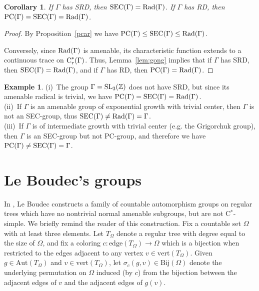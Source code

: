 \documentclass[12pt]{amsart}
\newtheorem{cor}[theorem]{Corollary}
\theoremstyle{definition}
\newtheorem{ex}[theorem]{Example}
\theoremstyle{remark}
\newcommand{\bZ}{{\mathbb{Z}}}
\newcommand{\G}{\Gamma}
\begin{document}
\begin{cor}\label{areqpc}
If $\Gamma$ has \textup{SRD}, then $\textup{SEC}(\Gamma) = \textup{Rad}(\Gamma)$.
If $\Gamma$ has \textup{RD}, then $\textup{PC}(\Gamma) = \textup{SEC}(\Gamma) = \textup{Rad}(\Gamma)$.
\end{cor}

\begin{proof}
By Proposition~\ref{pcar} we have $\textup{PC}(\G)\leq \textup{SEC}(\G)\leq \textup{Rad}(\G)$. 

Conversely, since $\textup{Rad}(\G)$ is amenable, its characteristic function extends to a continuous trace on $\textup{C}^*_r(\G)$. Thus, Lemma~\ref{lem:gong} implies that if $\Gamma$ has \textup{SRD}, then $\textup{SEC}(\Gamma) = \textup{Rad}(\Gamma)$, and if $\Gamma$ has \textup{RD}, then $\textup{PC}(\Gamma) = \textup{Rad}(\Gamma)$.
\end{proof}

\begin{ex}
(i)\ The group $\G={\rm SL}_3(\bZ)$ does not have \textup{SRD}, but since its amenable radical is trivial, we have $\textup{PC}(\G) = \textup{SEC}(\G) = \textup{Rad}(\G)$.
\\
(ii)\
If $\G$ is an amenable group of exponential growth with trivial center, then $\G$ is not an SEC-group, thus
$\textup{SEC}(\G) \neq \textup{Rad}(\G)=\G$.
\\
(iii)\
If $\G$ is of intermediate growth with trivial center (e.g. the Grigorchuk group), then $\G$ is an SEC-group but not PC-group, and therefore we have 
$\textup{PC}(\G) \neq \textup{SEC}(\G)=\G$.
\end{ex}

\section{Le Boudec's groups}

In \cite{boudec}, Le Boudec constructs a family of countable automorphism groups on regular trees which have no nontrivial normal amenable subgroups, but are not C$^*$-simple. We briefly remind the reader of this construction. Fix a countable set $\Omega$ with at least three elements. Let $T_{\Omega}$ denote a regular tree with degree equal to the size of $\Omega$, and fix a coloring $c: \text{edge}(T_{\Omega})\to \Omega$ which is a bijection when restricted to the edges adjacent to any vertex $v\in \text{vert}(T_{\Omega}).$ Given $g\in \text{Aut}(T_{\Omega})$ and $v\in \text{vert}(T_{\Omega})$, let $\sigma_c(g, v)\in \text{Bij}(\Omega)$ denote the underlying permutation on $\Omega$ induced (by $c$) from the bijection between the adjacent edges of $v$ and the adjacent edges of $g(v)$.
\end{document}
